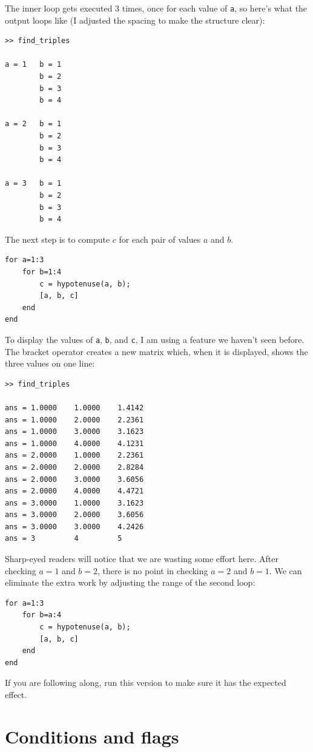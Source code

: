 \documentclass[
]{book}
\begin{document}
The inner loop gets executed 3 times, once for each value of {\tt a},
so here's what the output loops like (I adjusted the spacing to make
the structure clear):

\begin{verbatim}
>> find_triples

a = 1   b = 1
        b = 2
        b = 3
        b = 4

a = 2   b = 1
        b = 2
        b = 3
        b = 4

a = 3   b = 1
        b = 2
        b = 3
        b = 4
\end{verbatim}

The next step is to compute $c$ for each pair of values $a$ and $b$.

\begin{verbatim}
for a=1:3
    for b=1:4
        c = hypotenuse(a, b);
        [a, b, c]
    end
end
\end{verbatim}

To display the values of {\tt a}, {\tt b}, and {\tt c}, I am
using a feature we haven't seen before.  The bracket operator
creates a new matrix which, when it is displayed, shows the
three values on one line:

\begin{verbatim}
>> find_triples

ans = 1.0000    1.0000    1.4142
ans = 1.0000    2.0000    2.2361
ans = 1.0000    3.0000    3.1623
ans = 1.0000    4.0000    4.1231
ans = 2.0000    1.0000    2.2361
ans = 2.0000    2.0000    2.8284
ans = 2.0000    3.0000    3.6056
ans = 2.0000    4.0000    4.4721
ans = 3.0000    1.0000    3.1623
ans = 3.0000    2.0000    3.6056
ans = 3.0000    3.0000    4.2426
ans = 3         4         5
\end{verbatim}

Sharp-eyed readers will notice that we are wasting some effort here.
After checking $a=1$ and $b=2$, there is no point in checking
$a=2$ and $b=1$.  We can eliminate the extra work by adjusting the
range of the second loop:

\begin{verbatim}
for a=1:3
    for b=a:4
        c = hypotenuse(a, b);
        [a, b, c]
    end
end
\end{verbatim}

If you are following along, run this version to make sure it has
the expected effect.


\section{Conditions and flags}
\end{document}
